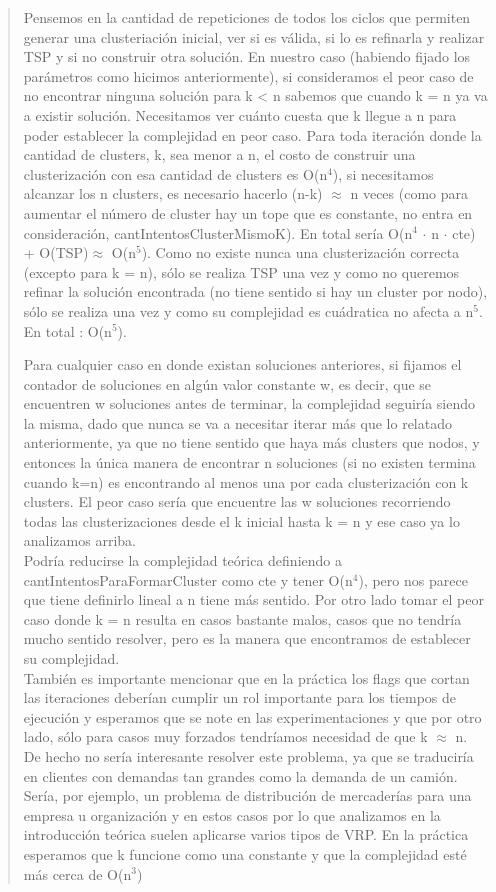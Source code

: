 \documentclass[11pt,a4paper]{article}
\begin{document}
\begin{verse}
Pensemos en la cantidad de repeticiones de todos los ciclos que permiten generar una clusteriación inicial, ver si es válida, si lo es refinarla y realizar TSP y si no construir otra solución. En nuestro caso (habiendo fijado los parámetros como hicimos anteriormente), si consideramos el peor caso de no encontrar ninguna solución para k < n sabemos que cuando k = n ya va a existir solución. Necesitamos ver cuánto cuesta que k llegue a n para poder establecer la complejidad en peor caso. Para toda iteración donde la cantidad de clusters, k, sea menor a n, el costo de construir una clusterización con esa cantidad de clusters es O(n$^{4}$), si necesitamos alcanzar los n clusters, es necesario hacerlo (n-k) $\approx$ n veces (como para aumentar el número de cluster hay un tope que es constante, no entra en consideración, cantIntentosClusterMismoK). En total sería O(n$^{4}$ $\cdot$ n $\cdot $ cte) + O(TSP)$\approx$ O(n$^{5}$).
Como no existe nunca una clusterización correcta (excepto para k = n), sólo se realiza TSP una vez y como no queremos refinar la solución encontrada (no tiene sentido si hay un cluster por nodo), sólo se realiza una vez y como su complejidad es cuádratica no afecta a n$^{5}$. \\ 
En total : O(n$^{5}$).

Para cualquier caso en donde existan soluciones anteriores, si fijamos el contador de soluciones en algún valor constante w, es decir, que se encuentren w soluciones antes de terminar, la complejidad seguiría siendo la misma, dado que nunca se va a necesitar iterar más que lo relatado anteriormente, ya que no tiene sentido que haya más clusters que nodos, y entonces la única manera de encontrar n soluciones (si no existen termina cuando k=n) es encontrando al menos una por cada clusterización con k clusters. El peor caso sería que encuentre las w soluciones recorriendo todas las clusterizaciones desde el k inicial hasta k = n y ese caso ya lo analizamos arriba. 
\\
Podría reducirse la complejidad teórica definiendo a cantIntentosParaFormarCluster como cte y tener O(n$^{4}$), pero nos parece que tiene definirlo lineal a n tiene más sentido. Por otro lado tomar el peor caso donde k = n resulta en casos bastante malos, casos que no tendría mucho sentido resolver, pero es la manera que encontramos de establecer su complejidad.\\
También es importante mencionar que en la práctica los flags que cortan las iteraciones deberían cumplir un rol importante para los tiempos de ejecución y esperamos que se note en las experimentaciones y que por otro lado, sólo para casos muy forzados tendríamos necesidad de que k $\approx$ n. De hecho no sería interesante resolver este problema, ya que se traduciría en clientes con demandas tan grandes como la demanda de un camión. Sería, por ejemplo, un problema de distribución de mercaderías para una empresa u organización y en estos casos por lo que analizamos en la introducción teórica suelen aplicarse varios tipos de VRP.
En la práctica esperamos que k funcione como una constante y que la complejidad esté más cerca de O(n$^{3}$)\\


\end{verse}
\end{document}
